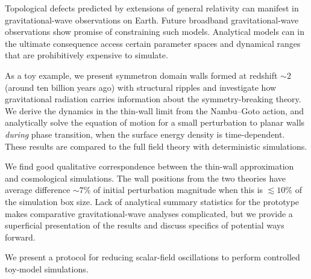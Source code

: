 

%
Topological defects predicted by extensions of general relativity can manifest in gravitational-wave observations on Earth. Future broadband gravitational-wave observations show promise of constraining such models. Analytical models can in the ultimate consequence access certain parameter spaces and dynamical ranges that are prohibitively expensive to simulate.

%
As a toy example, we present symmetron domain walls formed at redshift $\sim 2$ (around ten billion years ago) 
with structural ripples and investigate how gravitational radiation carries information about the symmetry-breaking theory. 
We derive the dynamics in the thin-wall limit from the Nambu--Goto action, and analytically solve the equation of motion for a small perturbation to planar walls \emph{during} phase transition, when the surface energy density is time-dependent. These results are compared to the full field theory with deterministic simulations.

%
We find good qualitative correspondence between the thin-wall approximation and cosmological simulations. 
The wall positions from the two theories have average difference $\sim 7 \%$ of initial perturbation magnitude when this is $\lesssim 10\%$ of the simulation box size. 
Lack of analytical summary statistics for the prototype makes comparative gravitational-wave analyses complicated, but we provide a superficial presentation of the results and discuss specifics of potential ways forward. 

%
We present a protocol for reducing scalar-field oscillations to perform controlled toy-model simulations.
